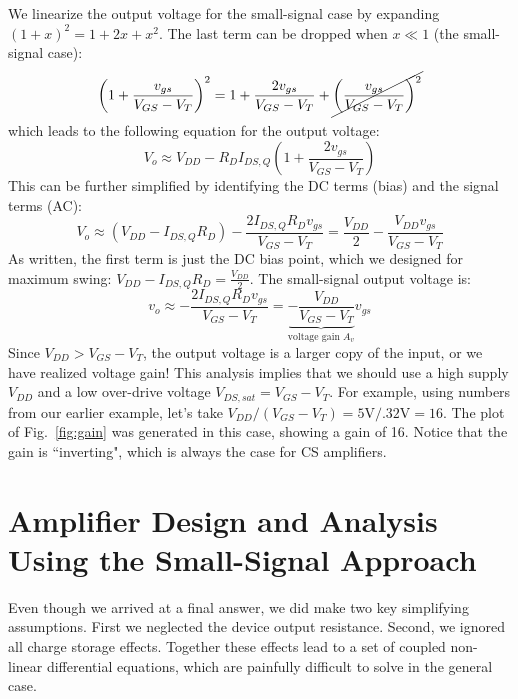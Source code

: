 We linearize the output voltage for the small-signal case by expanding  $(1+x)^2 = 1 + 2x + x^2$.  The last term can be dropped when $x \ll 1$ (the small-signal case):
%
\begin{equation}
	{\left( {1 + \frac{{{v_{gs}}}}{{{V_{GS}} - {V_T}}}} \right)^2} = 1 + \frac{{2{v_{gs}}}}{{{V_{GS}} - {V_T}}} + \cancel{\left( {\frac{{{v_{gs}}}}	{{{V_{GS}} - {V_T}}}} \right)^2}
\end{equation}
%
which leads to the following equation for the output voltage:
\begin{equation}
	{V_o} \approx {V_{DD}} - {R_D}{I_{DS,Q}}\left( {1 + \frac{{2{v_{gs}}}}{{{V_{GS}} - {V_T}}}} \right)
\end{equation}
%
This can be further simplified by identifying the DC terms (bias) and the signal terms (AC):
\begin{equation}
	{V_o} \approx ({V_{DD}} - {I_{DS,Q}}{R_{D}}) - \frac{{2{I_{DS,Q}}{R_{D}}{v_{gs}}}}{{{V_{GS}} - {V_T}}} = \frac{{{V_{DD}}}}{2} - \frac{{{V_{DD}}{v_{gs}}}}{{{V_{GS}} - {V_T}}}
\end{equation}
%
%
As written, the first term is just the DC bias point, which we designed for maximum swing:  $V_{DD} - I_{DS,Q} R_{D} = \frac{V_{DD}}{2}$.  The small-signal output voltage is:
%
\begin{equation}
	v_o \approx  - \frac{2I_{DS,Q} R_{D} v_{gs}}
                              {V_{GS} - V_T} = 
\underbrace{ - \frac{V_{DD}}{V_{GS} - V_T}}_{\text{voltage gain } A_v}  v_{gs}
\end{equation}
%
Since $V_{DD} > V_{GS} - V_T$, the output voltage is a larger copy of the input, or we have realized voltage gain!  This analysis implies that we should use a high supply $V_{DD}$ and a low over-drive voltage $V_{DS,sat} = V_{GS} - V_T$.  For example, using numbers from our earlier example, let's take $V_{DD} / (V_{GS} - V_T) = 5\mathrm{V}/.32\mathrm{V} = 16$.  The plot of Fig.~\ref{fig:gain} was generated in this case, showing a gain of 16.  Notice that the gain is ``inverting", which is always the case for CS amplifiers.





\section{Amplifier Design and Analysis Using the Small-Signal Approach}

Even though we arrived at a final answer, we did make two key simplifying assumptions.  First we neglected the device output resistance.  Second, we ignored all charge storage effects.  Together these effects lead to a set of coupled non-linear differential equations, which are painfully difficult to solve in the general case.

